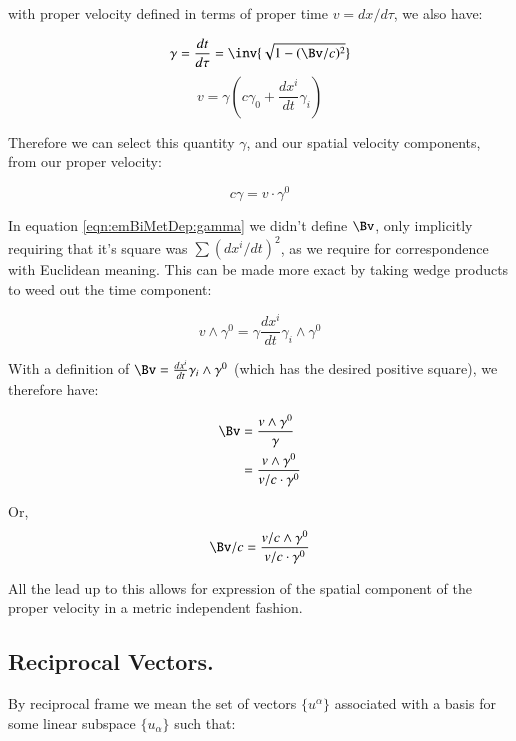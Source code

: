 with proper velocity defined in terms of proper time $v = dx/d\tau$, we also have:

\begin{equation}\label{eqn:emBiMetDep:gamma}
\gamma = \frac{dt}{d\tau} = \inv{ \sqrt{ 1 - (\Bv/c)^2 } }
\end{equation}
\begin{equation}
v = \gamma \left(c \gamma_0 + \frac{d x^i }{d t} \gamma_i \right)
\end{equation}

Therefore we can select this quantity $\gamma$, and our spatial velocity components, from our proper velocity:

\begin{equation*}
c \gamma = v \cdot \gamma^0
\end{equation*}

In equation \ref{eqn:emBiMetDep:gamma} we didn't define $\Bv$, only implicitly requiring that it's square was $\sum (dx^i/dt)^2$, as we require for correspondence with Euclidean meaning.  This can be made more exact by
taking wedge products to weed out the time component:

\begin{equation*}
v \wedge \gamma^0 = \gamma \frac{d x^i }{d t} \gamma_i \wedge \gamma^0
\end{equation*}

With a definition of $\Bv = \frac{d x^i }{d t} \gamma_i \wedge \gamma^0$ (which has the desired positive square), we therefore have:

\begin{align*}
\Bv
&= \frac{v \wedge \gamma^0 }{\gamma} \\
&= \frac{v \wedge \gamma^0 }{ v/c \cdot \gamma^0 } \\
\end{align*}

Or,
\begin{equation}
\Bv/c = \frac{v/c \wedge \gamma^0 }{ v/c \cdot \gamma^0 }
\end{equation}

All the lead up to this allows for expression of the spatial component of the proper velocity in a metric independent fashion.

\subsection{Reciprocal Vectors. }

By reciprocal frame we mean the set of vectors $\{u^{\alpha}\}$ associated with a basis
for some linear subspace $\{u_{\alpha}\}$ such that:

